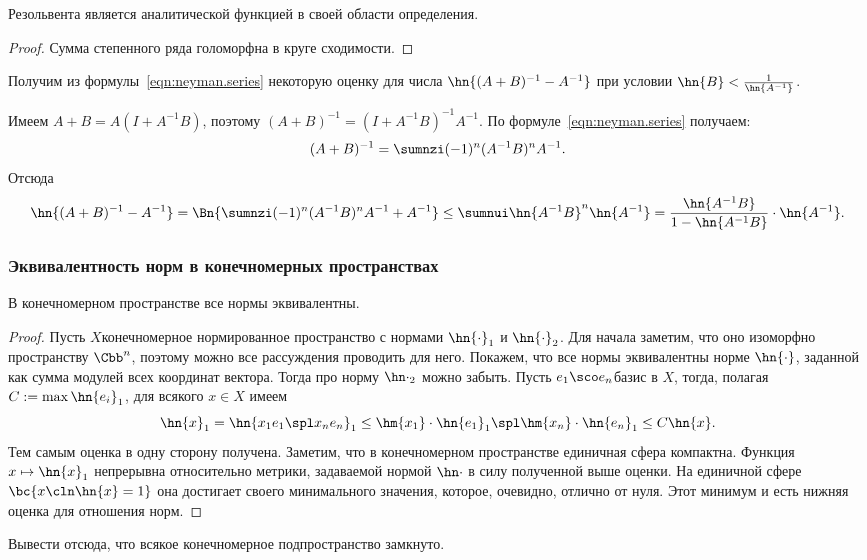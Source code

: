 \documentclass[a4paper]{article}
\begin{document}
\begin{imp}
Резольвента является аналитической функцией в своей области определения.
\end{imp}
\begin{proof}
Сумма степенного ряда голоморфна в круге сходимости.
\end{proof}

Получим из формулы~\eqref{eqn:neyman.series} некоторую оценку для
числа $\hn{(A+B)^{-1}-A^{-1}}$ при условии $\hn{B} < \frac{1}{\hn{A^{-1}}}$.

Имеем $A + B = A(I + A^{-1}B)$, поэтому $(A+B)^{-1} = (I + A^{-1}B)^{-1}A^{-1}$.
По формуле~\eqref{eqn:neyman.series} получаем:
$$(A+B)^{-1} = \sumnzi (-1)^{n}(A^{-1}B)^nA^{-1}.$$
Отсюда
$$\hn{(A+B)^{-1} - A^{-1}} = \Bn{\sumnzi (-1)^n(A^{-1}B)^nA^{-1} + A^{-1}} \le \sumnui \hn{A^{-1}B}^n\hn{A^{-1}} =
\frac{\hn{A^{-1}B}}{1 - \hn{A^{-1}B}}\cdot\hn{A^{-1}}.$$


\subsubsection{Эквивалентность норм в конечномерных пространствах}
\begin{theorem}
В конечномерном пространстве все нормы эквивалентны.
\end{theorem}
\begin{proof}
Пусть $X$\т конечномерное нормированное пространство с нормами $\hn{\cdot}_1$ и $\hn{\cdot}_2$.
Для начала заметим, что оно изоморфно пространству $\Cbb^n$, поэтому можно все рассуждения проводить
для него. Покажем, что все нормы эквивалентны норме $\hn{\cdot}$, заданной как сумма модулей всех координат вектора.
Тогда про норму $\hn\cdot_2$ можно забыть. Пусть $e_1\sco e_n$\т базис в $X$, тогда,
полагая $C := \max \hn{e_i}_1$, для всякого $x \in X$ имеем
$$\hn{x}_1 = \hn{x_1e_1\spl x_n e_n}_1 \le \hm{x_1}\cdot \hn{e_1}_1\spl\hm{x_n}\cdot \hn{e_n}_1 \le C \hn{x}.$$
Тем самым оценка в одну сторону получена. Заметим, что в конечномерном пространстве единичная
сфера компактна. Функция $x \mapsto \hn{x}_1$ непрерывна относительно метрики, задаваемой
нормой $\hn\cdot$ в силу полученной выше оценки. На единичной сфере $\bc{x\cln \hn{x} = 1}$ она достигает своего
минимального значения, которое, очевидно, отлично от нуля. Этот минимум и есть нижняя оценка для отношения норм.
\end{proof}

\begin{problem}
Вывести отсюда, что всякое конечномерное подпространство замкнуто.
\end{problem}
\end{document}
